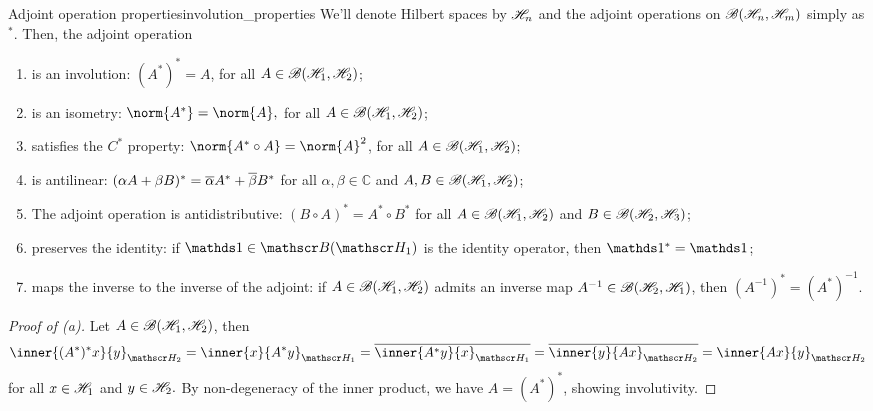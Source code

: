 \begin{theorem}{Adjoint operation properties}{involution_properties}
    We'll denote Hilbert spaces by \(\mathscr{H}_n\) and the adjoint operations on \(\mathscr{B}(\mathscr{H}_n, \mathscr{H}_m)\) simply as \(^*\). Then, the adjoint operation
    \begin{enumerate}[label=(\alph*)]
        \item is an involution: \((A^*)^* = A\), for all \(A \in \mathscr{B}(\mathscr{H}_1, \mathscr{H}_2)\);
        \item is an isometry: \(\norm{A^*} = \norm{A},\) for all \(A \in \mathscr{B}(\mathscr{H}_1, \mathscr{H}_2)\);
        \item satisfies the \(C^*\) property: \(\norm{A^* \circ A} = \norm{A}^2\), for all \(A \in \mathscr{B}(\mathscr{H}_1, \mathscr{H}_2)\);
        \item is antilinear: \((\alpha A + \beta B)^* = \overline{\alpha} A^* + \overline{\beta} B^*\) for all \(\alpha, \beta \in \mathbb{C}\) and \(A, B \in \mathscr{B}(\mathscr{H}_1, \mathscr{H}_2)\);
        \item The adjoint operation is antidistributive: \((B \circ A)^* = A^*\circ B^*\) for all \(A \in \mathscr{B}(\mathscr{H}_1, \mathscr{H}_2)\) and \(B \in \mathscr{B}(\mathscr{H}_2, \mathscr{H}_3)\);
        \item preserves the identity: if \(\unity \in \bounded(\hilbert_1)\) is the identity operator, then \(\unity^* = \unity\);
        \item maps the inverse to the inverse of the adjoint: if \(A \in \mathscr{B}(\mathscr{H}_1, \mathscr{H}_2)\) admits an inverse map \(A^{-1} \in \mathscr{B}(\mathscr{H}_2, \mathscr{H}_1)\), then \((A^{-1})^* = (A^*)^{-1}\).
    \end{enumerate}
\end{theorem}
\begin{proof}[Proof of (a)]
    Let \(A \in \mathscr{B}(\mathscr{H}_1, \mathscr{H}_2)\), then
    \begin{equation*}
        \inner{(A^*)^*x}{y}_{\hilbert_2} = \inner{x}{A^*y}_{\hilbert_1} = \conj{\inner{A^*y}{x}_{\hilbert_1}} = \conj{\inner{y}{Ax}_{\hilbert_2}} = \inner{Ax}{y}_{\hilbert_2}
    \end{equation*}
    for all \(x \in \mathscr{H}_1\) and \(y \in \mathscr{H}_2.\) By non-degeneracy of the inner product, we have \(A = (A^*)^*\), showing involutivity.
\end{proof}
